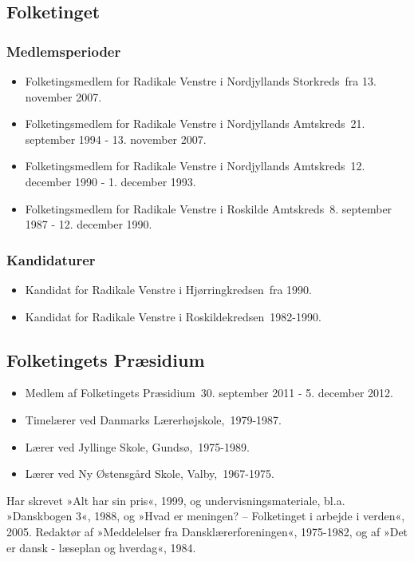 \documentclass[11pt, a4paper]{awesome-cv}
\begin{document}
\begin{cvletter}
\subsection*{Folketinget}
\subsubsection*{Medlemsperioder}
\begin{itemize}
\item Folketingsmedlem for Radikale Venstre i Nordjyllands Storkreds fra 13. november 2007.
\item Folketingsmedlem for Radikale Venstre i Nordjyllands Amtskreds 21. september 1994 - 13. november 2007.
\item Folketingsmedlem for Radikale Venstre i Nordjyllands Amtskreds 12. december 1990 - 1. december 1993.
\item Folketingsmedlem for Radikale Venstre i Roskilde Amtskreds 8. september 1987 - 12. december 1990.
\end{itemize}
\subsubsection*{Kandidaturer}
\begin{itemize}
\item Kandidat for Radikale Venstre i Hjørringkredsen fra 1990.
\item Kandidat for Radikale Venstre i Roskildekredsen 1982-1990.
\end{itemize}
\subsection*{Folketingets Præsidium}
\begin{itemize}
\item Medlem af Folketingets Præsidium 30. september 2011 - 5. december 2012.
\end{itemize}
\begin{itemize}
\item Timelærer ved Danmarks Lærerhøjskole, 1979-1987.
\item Lærer ved Jyllinge Skole, Gundsø, 1975-1989.
\item Lærer ved Ny Østensgård Skole, Valby, 1967-1975.
\end{itemize}
Har skrevet »Alt har sin pris«, 1999, og undervisningsmateriale, bl.a. »Danskbogen 3«, 1988, og »Hvad er meningen? – Folketinget i arbejde i verden«, 2005. Redaktør af »Meddelelser fra Dansklærerforeningen«, 1975-1982, og af »Det er dansk - læseplan og hverdag«, 1984.

\end{cvletter}
\end{document}

